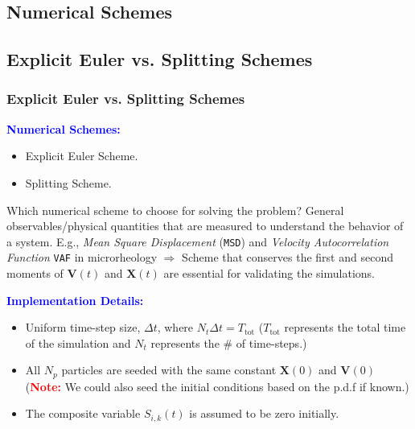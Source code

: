 \documentclass[a4paper,10pt]{beamer}
\newcommand{\BS}[1]{\boldsymbol{#1}}
\begin{document}
	\begin{frame}
		\section{Numerical Schemes}
		\subsection{Explicit Euler vs. Splitting Schemes}
		\frametitle{Explicit Euler vs. Splitting Schemes}
		\footnotesize
		\textcolor{blue}{\textbf{Numerical Schemes:}}
		\begin{itemize}
			\item {Explicit Euler Scheme.}
			\item {Splitting Scheme.}
		\end{itemize}
		\begin{alertblock}{Which numerical scheme to choose for solving the problem?}
			General observables/physical quantities that are measured to understand the behavior of a system. E.g., \textit{Mean Square Displacement} (\texttt{MSD}) and \textit{Velocity Autocorrelation Function} \texttt{VAF} in microrheology $\Rightarrow$ Scheme that conserves the first and second moments of $\BS{V}(t)$ and $\BS{X}(t)$ are essential for validating the simulations.
		\end{alertblock}
		\textcolor{blue}{\textbf{Implementation Details:}}
		\begin{itemize}
			\item {Uniform time-step size, $\Delta t$, where $N_{t} \Delta t = T_{\text{tot}}$ ($T_{\text{tot}}$ represents the total time of the simulation and $N_{t}$ represents the \# of time-steps.)}
			\item {All $N_{p}$ particles are seeded with the same constant $\BS{X}(0)$ and $\BS{V}(0)$ (\textcolor{red}{\textbf{Note:}} We could also seed the initial conditions based on the p.d.f if known.)}
			\item {The composite variable $S_{i,k}(t)$ is assumed to be zero initially.}
		\end{itemize}
	\end{frame}
	
\end{document}
